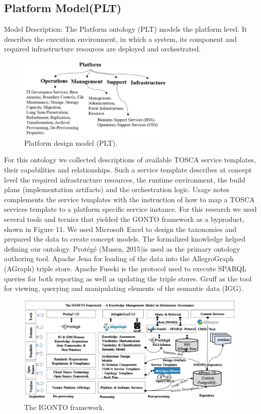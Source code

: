 \documentclass[a4paper,twoside]{article}
\begin{document}
\subsection{Platform Model(PLT)}
Model Description: The Platform ontology (PLT) models the platform level. It describes the execution environment, in which a system, its component and required infrastructure resources are deployed and orchestrated. 
%
\begin{figure}[ht]
  \centering
    \includegraphics[width=7.5cm]{images/Fig10-IG.Plt.Model.png }
    \caption{Platform design model (PLT).}
  \label{fig:pltmod}
\end{figure}
For this ontology we collected descriptions of available TOSCA service templates, their capabilities and relationships. Such a service template describes at concept level the required infrastructure resources, the runtime environment, the build plans (implementation artifacts) and the orchestration logic. Usage notes complements the service templates with the instruction of how to map a TOSCA services template to a platform specific service instance. 
For this research we used several tools and tecnics that yielded the GONTO framework as a byproduct, shown in Figure 11. We used Microsoft Excel to design the taxonomies and prepared the data to create concept models. The formalized knowledge helped defining our ontology. Protégé (Musen, 2015)is used as the primary ontology authoring tool. Apache Jena for loading of the data into the AllegroGraph (AGraph) triple store. Apache Fuseki is the protocol used to execute SPARQL queries for both reporting as well as updating the triple stores. Gruff as the tool for viewing, querying and manipulating elements of the semantic data (IGG).
%
%
\begin{figure}[!hbtp]
  \centering
    \includegraphics[width=\textwidth] {images/Fig11-IG.ONTO.Framework.png }
    \caption{The IGONTO framework.}
  \label{fig:ontfr}
\end{figure}
%
%
% 
\end{document}
